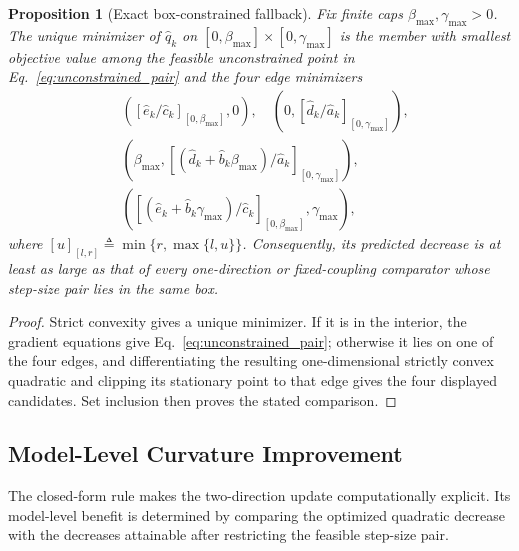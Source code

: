 \documentclass{article}
\newtheorem{proposition}{Proposition}
\theoremstyle{remark}
\begin{document}
\begin{proposition}[Exact box-constrained fallback]\label{prop:box_fallback}
Fix finite caps $\beta_{\max},\gamma_{\max}>0$.
The unique minimizer of $\hat q_k$ on $[0,\beta_{\max}]\times[0,\gamma_{\max}]$ is the member with smallest objective value among the feasible unconstrained point in Eq.~\eqref{eq:unconstrained_pair} and the four edge minimizers
\begin{align*}
&\left(\left[\hat e_k/\hat c_k\right]_{[0,\beta_{\max}]},0\right),\quad
\left(0,\left[\hat d_k/\hat a_k\right]_{[0,\gamma_{\max}]}\right),\\
&\left(\beta_{\max},
\left[(\hat d_k+\hat b_k\beta_{\max})/\hat a_k\right]_{[0,\gamma_{\max}]}\right),\\
&\left(\left[(\hat e_k+\hat b_k\gamma_{\max})/\hat c_k\right]_{[0,\beta_{\max}]},
\gamma_{\max}\right),
\end{align*}
where $[u]_{[l,r]}\triangleq\min\{r,\max\{l,u\}\}$.
Consequently, its predicted decrease is at least as large as that of every one-direction or fixed-coupling comparator whose step-size pair lies in the same box.
\end{proposition}
\begin{proof}
Strict convexity gives a unique minimizer.
If it is in the interior, the gradient equations give Eq.~\eqref{eq:unconstrained_pair}; otherwise it lies on one of the four edges, and differentiating the resulting one-dimensional strictly convex quadratic and clipping its stationary point to that edge gives the four displayed candidates.
Set inclusion then proves the stated comparison.
\end{proof}

\subsection{Model-Level Curvature Improvement}\label{subsec:dominance}

The closed-form rule makes the two-direction update computationally explicit.
Its model-level benefit is determined by comparing the optimized quadratic decrease with the decreases attainable after restricting the feasible step-size pair.
\end{document}
